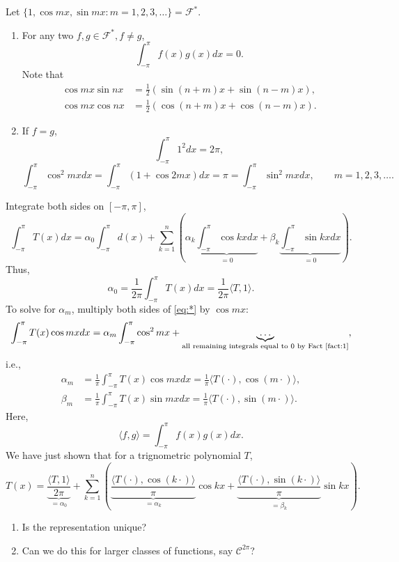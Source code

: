 \documentclass[letterpaper, reqno,11pt]{article}
\begin{document}
\begin{fact} \label{fact:1}
  \normalfont Let $\{ 1, \cos mx, \sin mx : m = 1, 2, 3, \ldots \} = \mathcal F^*$.
  \begin{enumerate}
  \item For any two $f, g \in \mathcal F^*, f \neq g$,
    \[ \int_{-\pi}^\pi f(x) g(x) dx = 0. \]
    Note that
    \begin{align*}
      \cos mx \sin nx &= \frac{1}{2} (\sin (n + m)x + \sin (n - m)x), \\
      \cos mx \cos nx &= \frac{1}{2} (\cos (n + m)x + \cos (n - m)x).
    \end{align*}
  \item If $f = g$,
    \[ \int_{-\pi}^\pi 1^2 dx = 2\pi, \]
    \[ \int_{-\pi}^\pi \cos^2 mx dx = \int_{-\pi}^\pi (1 + \cos 2mx) dx = \pi = \int_{-\pi}^\pi \sin^2 mx dx, \qquad m = 1, 2, 3, \ldots. \]
  \end{enumerate}
\end{fact}

Integrate both sides on $[-\pi, \pi]$,
\[ \int_{-\pi}^\pi T(x) dx = \alpha_0 \int_{-\pi}^\pi d(x) + \sum_{k = 1}^n \left(\alpha_k \underbrace{\int_{-\pi}^\pi \cos kx dx}_{= 0} + \beta_k \underbrace{\int_{-\pi}^\pi \sin kx dx}_{= 0}\right). \]
Thus,
\[ \alpha_0 = \frac{1}{2\pi} \int_{-\pi}^\pi T(x) dx = \frac{1}{2\pi} \langle T, 1 \rangle. \]
To solve for $\alpha_m$, multiply both sides of \eqref{eq:*} by $\cos mx$:
\[ \int_{-\pi}^\pi T(x) \cos mx dx = \alpha_m \int_{-\pi}^\pi \cos^2 mx + \underbrace{\ldots}_\text{all remaining integrals equal to $0$ by Fact \ref{fact:1}}, \]
i.e.,
\begin{align*}
  \alpha_m &= \frac{1}{\pi} \int_{-\pi}^\pi T(x) \cos mx dx = \frac{1}{\pi} \langle T(\cdot), \cos(m \cdot) \rangle, \\
  \beta_m &= \frac{1}{\pi} \int_{-\pi}^\pi T(x) \sin mx dx = \frac{1}{\pi} \langle T(\cdot), \sin(m \cdot) \rangle.
\end{align*}
Here,
\[ \langle f, g \rangle = \int_{-\pi}^\pi f(x) g(x) dx. \]
We have just shown that for a trignometric polynomial $T$,
\[ T(x) = \underbrace{\frac{\langle T, 1 \rangle}{2\pi}}_{= \alpha_0} + \sum_{k = 1}^n \left(\underbrace{\frac{\langle T(\cdot), \cos (k \cdot) \rangle}{\pi}}_{= \alpha_k} \cos kx + \underbrace{\frac{\langle T(\cdot), \sin (k \cdot) \rangle}{\pi}}_{= \beta_k} \sin kx\right). \]

\begin{enumerate}
\item Is the representation unique?
\item Can we do this for larger classes of functions, say $\mathcal C^{2\pi}$?
\end{enumerate}
\end{document}
